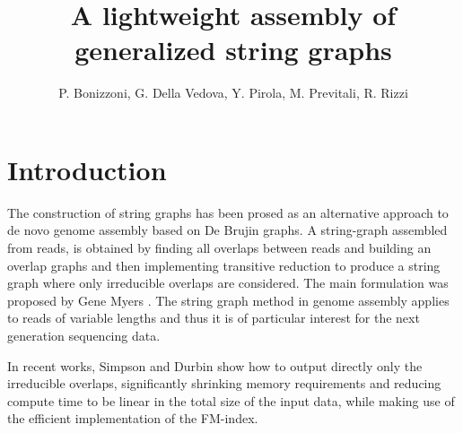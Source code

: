 \documentclass[11pt]{article}
\begin{document}
\newtheorem{theorem}{theorem}[section]
\newtheorem{lemma}[theorem]{Lemma}
\newtheorem{proposition}[theorem]{Proposition}
\newtheorem{observation}[theorem]{Observation}
\newtheorem{corollary}[theorem]{Corollary}
\newtheorem{claim}[theorem]{Claim}
\newtheorem{property}[theorem]{Property}
\theoremstyle{definition}
\newtheorem{definition}[theorem]{Definition}
\newtheorem{problem}{problem}



\title{A lightweight  assembly of generalized string graphs}

\author{ P. Bonizzoni, G. Della Vedova, Y. Pirola, M. Previtali,  R. Rizzi}


\maketitle

\begin{abstract}


\end{abstract}

\section{Introduction}
The construction of  string graphs has been prosed as an alternative approach to de novo  genome assembly based on De Brujin graphs.
A string-graph assembled from reads, is obtained by finding all overlaps between reads and building an overlap graphs and  then implementing 
transitive reduction to produce a string graph where only irreducible overlaps are considered.
The main  formulation was proposed by Gene Myers \cite{Myers05}.
The string graph method in genome assembly applies to reads of variable lengths and thus it is of particular interest for the next generation sequencing data.

In recent works, Simpson and Durbin \cite{Simpson10} show  how to output directly only the irreducible overlaps, significantly shrinking memory
requirements and reducing compute time to be linear in the total size of the input data, while making use of the efficient implementation of the FM-index.
\end{document}
